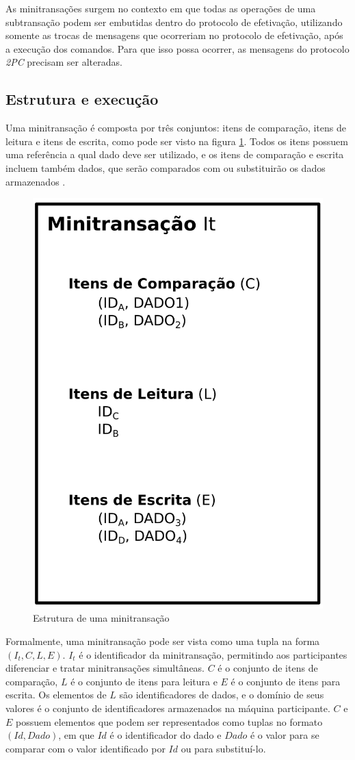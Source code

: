 \documentclass[11pt,twoside,a4paper]{book}
\begin{document}
As minitransações surgem no contexto em que todas as operações de uma subtransação podem ser embutidas dentro do protocolo de efetivação, utilizando somente as trocas de mensagens que ocorreriam no protocolo de efetivação, após a execução dos comandos. Para que isso possa ocorrer, as mensagens do protocolo \emph{2PC} precisam ser alteradas.

\subsection{Estrutura e execução}
\label{subsec:estrutura-minitransacoes}
Uma minitransação é composta por três conjuntos: itens de comparação, itens de leitura e itens de escrita, como pode ser visto na figura \ref{fig:estrutura_minitransacao}. Todos os itens possuem uma referência a qual dado deve ser utilizado, e os itens de comparação e escrita incluem também dados, que serão comparados com ou substituirão os dados armazenados \cite{sinfonia}. 

\begin{figure}
  \centering
  \includegraphics[width=.40\textwidth]{estrutura_minitransacao} 
  \caption{Estrutura de uma minitransação}
  \label{fig:estrutura_minitransacao} 
\end{figure}

Formalmente, uma minitransação pode ser vista como uma tupla na forma $(I_t, C, L, E)$. $I_t$ é o identificador da minitransação, permitindo aos participantes diferenciar e tratar minitransações simultâneas. \(C\) é o conjunto de itens de comparação, \(L\) é o conjunto de itens para leitura e \(E\) é o conjunto de itens para escrita. Os elementos de \(L\) são identificadores de dados, e o domínio de seus valores é o conjunto de identificadores armazenados na máquina participante. \(C\) e \(E\) possuem elementos que podem ser representados como tuplas no formato \((Id, Dado)\), em que \(Id\) é o identificador do dado e \(Dado\) é o valor para se comparar com o valor identificado por $Id$ ou para substituí-lo.
\end{document}
